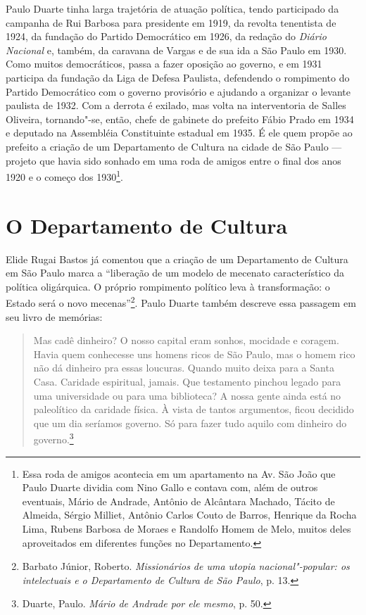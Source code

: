 Paulo Duarte tinha larga trajetória de atuação política, tendo
participado da campanha de Rui Barbosa para presidente em 1919, da
revolta tenentista de 1924, da fundação do Partido Democrático em 1926,
da redação do \emph{Diário Nacional} e, também, da caravana de Vargas e
de sua ida a São Paulo em 1930. Como muitos democráticos, passa a fazer
oposição ao governo, e em 1931 participa da fundação da Liga de Defesa
Paulista, defendendo o rompimento do Partido Democrático com o governo
provisório e ajudando a organizar o levante paulista de 1932. Com a
derrota é exilado, mas volta na interventoria de Salles Oliveira,
tornando"-se, então, chefe de gabinete do prefeito Fábio Prado em 1934 e
deputado na Assembléia Constituinte estadual em 1935. É ele quem propõe
ao prefeito a criação de um Departamento de Cultura na cidade de São
Paulo --- projeto que havia sido sonhado em uma roda de amigos entre o
final dos anos 1920 e o começo dos 1930\footnote{Essa roda de amigos
  acontecia em um apartamento na Av. São João que Paulo Duarte dividia
  com Nino Gallo e contava com, além de outros eventuais, Mário de
  Andrade, Antônio de Alcântara Machado, Tácito de Almeida, Sérgio
  Milliet, Antônio Carlos Couto de Barros, Henrique da Rocha Lima,
  Rubens Barbosa de Moraes e Randolfo Homem de Melo, muitos deles
  aproveitados em diferentes funções no Departamento.}.

\section{O Departamento de Cultura}

Elide Rugai Bastos já comentou que a criação de um Departamento de
Cultura em São Paulo marca a ``liberação de um modelo de mecenato
característico da política oligárquica. O próprio rompimento político
leva à transformação: o Estado será o novo mecenas''\footnote{Barbato
  Júnior, Roberto. \emph{Missionários de uma utopia nacional"-popular: os
  intelectuais e o Departamento de Cultura de São Paulo}, p. 13.}. Paulo
Duarte também descreve essa passagem em seu livro de memórias:

\begin{quote}
Mas cadê dinheiro? O nosso capital eram sonhos, mocidade e coragem.
Havia quem conhecesse uns homens ricos de São Paulo, mas o homem rico
não dá dinheiro pra essas loucuras. Quando muito deixa para a Santa
Casa. Caridade espiritual, jamais. Que testamento pinchou legado para
uma universidade ou para uma biblioteca? A nossa gente ainda está no
paleolítico da caridade física. À vista de tantos argumentos, ficou
decidido que um dia seríamos governo. Só para fazer tudo aquilo com
dinheiro do governo.\footnote{Duarte, Paulo. \emph{Mário de Andrade por
  ele mesmo}, p. 50.}
\end{quote}


